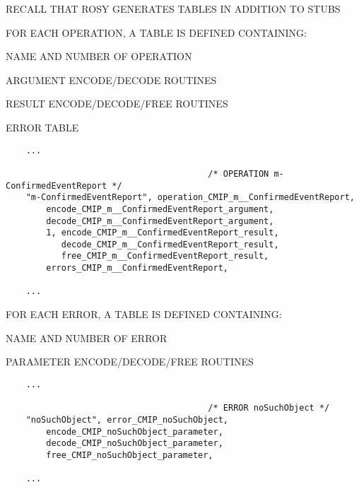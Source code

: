 \begin{bwslide}

\begin{nrtc}
\item	RECALL THAT ROSY GENERATES TABLES IN ADDITION TO STUBS

\item	FOR EACH OPERATION, A TABLE IS DEFINED CONTAINING:
    \begin{nrtc}
    \item	NAME AND NUMBER OF OPERATION

    \item	ARGUMENT ENCODE/DECODE ROUTINES

    \item	RESULT ENCODE/DECODE/FREE ROUTINES

    \item	ERROR TABLE
    \end{nrtc}
\end{nrtc}\small

\begin{verbatim}
    ...

                                        /* OPERATION m-ConfirmedEventReport */
    "m-ConfirmedEventReport", operation_CMIP_m__ConfirmedEventReport,
        encode_CMIP_m__ConfirmedEventReport_argument,
        decode_CMIP_m__ConfirmedEventReport_argument,
        1, encode_CMIP_m__ConfirmedEventReport_result,
           decode_CMIP_m__ConfirmedEventReport_result,
           free_CMIP_m__ConfirmedEventReport_result,
        errors_CMIP_m__ConfirmedEventReport,

    ...
\end{verbatim}
\end{bwslide}


\begin{bwslide}

\begin{nrtc}
\item	FOR EACH ERROR, A TABLE IS DEFINED CONTAINING:
    \begin{nrtc}
    \item	NAME AND NUMBER OF ERROR

    \item	PARAMETER ENCODE/DECODE/FREE ROUTINES
    \end{nrtc}
\end{nrtc}\small

\begin{verbatim}
    ...

                                        /* ERROR noSuchObject */
    "noSuchObject", error_CMIP_noSuchObject,
        encode_CMIP_noSuchObject_parameter,
        decode_CMIP_noSuchObject_parameter,
        free_CMIP_noSuchObject_parameter,

    ...
\end{verbatim}
\end{bwslide}


